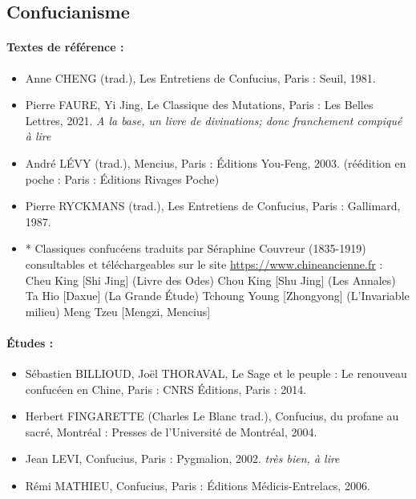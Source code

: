 \subsection{Confucianisme}

\paragraph{Textes de référence :}
\begin{itemize}
    \item Anne CHENG (trad.), Les Entretiens de Confucius, Paris : Seuil, 1981. 
    \item Pierre FAURE, Yi Jing, Le Classique des Mutations, Paris : Les Belles Lettres, 2021. \textit{A la base, un livre de divinations; donc franchement compiqué à lire}
    \item André LÉVY (trad.), Mencius, Paris : Éditions You-Feng, 2003. (réédition en poche  : Paris : Éditions Rivages Poche)
    \item Pierre RYCKMANS (trad.), Les Entretiens de Confucius, Paris : Gallimard, 1987.
    \item * Classiques confucéens traduits par Séraphine Couvreur (1835-1919) consultables et téléchargeables sur le site \url{https://www.chineancienne.fr} :
Cheu King [Shi Jing] (Livre des Odes)
Chou King [Shu Jing] (Les Annales)
Ta Hio [Daxue] (La Grande Étude)
Tchoung Young [Zhongyong] (L’Invariable milieu)
Meng Tzeu [Mengzi, Mencius] 
 

\end{itemize}

\paragraph{Études :}

\begin{itemize}
    \item Sébastien BILLIOUD, Joël THORAVAL, Le Sage et le peuple : Le renouveau confucéen en Chine, Paris : CNRS Éditions, Paris : 2014.  
    \item Herbert FINGARETTE (Charles Le Blanc trad.), Confucius, du profane au sacré, Montréal : Presses de l’Université de Montréal, 2004.
    \item Jean LEVI, Confucius, Paris : Pygmalion, 2002. \textit{très bien, à lire}
    \item Rémi MATHIEU, Confucius, Paris : Éditions Médicis-Entrelacs, 2006.

\end{itemize}



